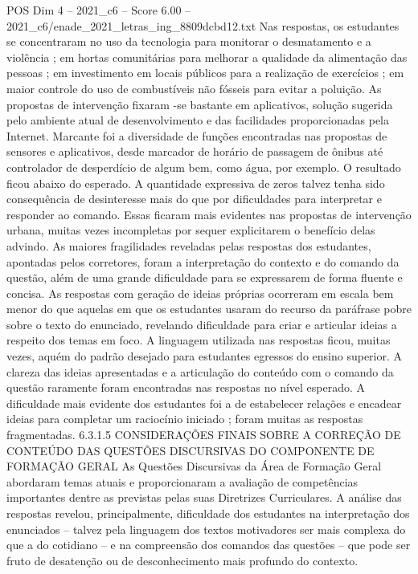\begin{textsample}{POS Dim 4 – 2021\_c6 – Score 6.00 – 2021\_c6/enade\_2021\_letras\_ing\_8809dcbd12.txt}
Nas respostas, os estudantes se concentraram no uso da tecnologia para monitorar o desmatamento e a violência ; em hortas comunitárias para melhorar a qualidade da alimentação das pessoas ; em investimento em locais públicos para a realização de exercícios ; em maior controle do uso de combustíveis não fósseis para evitar a poluição.
As propostas de intervenção fixaram -se bastante em aplicativos, solução sugerida pelo ambiente atual de desenvolvimento e das facilidades proporcionadas pela Internet.
Marcante foi a diversidade de funções encontradas nas propostas de sensores e aplicativos, desde marcador de horário de passagem de ônibus até controlador de desperdício de algum bem, como água, por exemplo.
O resultado ficou abaixo do esperado.
A quantidade expressiva de zeros talvez tenha sido consequência de desinteresse mais do que por dificuldades para interpretar e responder ao comando.
Essas ficaram mais evidentes nas propostas de intervenção urbana, muitas vezes incompletas por sequer explicitarem o benefício delas advindo.
As maiores fragilidades reveladas pelas respostas dos estudantes, apontadas pelos corretores, foram a interpretação do contexto e do comando da questão, além de uma grande dificuldade para se expressarem de forma fluente e concisa.
As respostas com geração de ideias próprias ocorreram em escala bem menor do que aquelas em que os estudantes usaram do recurso da paráfrase pobre sobre o texto do enunciado, revelando dificuldade para criar e articular ideias a respeito dos temas em foco.
A linguagem utilizada nas respostas ficou, muitas vezes, aquém do padrão desejado para estudantes egressos do ensino superior.
A clareza das ideias apresentadas e a articulação do conteúdo com o comando da questão raramente foram encontradas nas respostas no nível esperado.
A dificuldade mais evidente dos estudantes foi a de estabelecer relações e encadear ideias para completar um raciocínio iniciado ; foram muitas as respostas fragmentadas. 6.3.1.5 CONSIDERAÇÕES FINAIS SOBRE A CORREÇÃO DE CONTEÚDO DAS QUESTÕES DISCURSIVAS DO COMPONENTE DE FORMAÇÃO GERAL As Questões Discursivas da Área de Formação Geral abordaram temas atuais e proporcionaram a avaliação de competências importantes dentre as previstas pelas suas Diretrizes Curriculares.
A análise das respostas revelou, principalmente, dificuldade dos estudantes na interpretação dos enunciados – talvez pela linguagem dos textos motivadores ser mais complexa do que a do cotidiano – e na compreensão dos comandos das questões – que pode ser fruto de desatenção ou de desconhecimento mais profundo do contexto.

\end{textsample}
